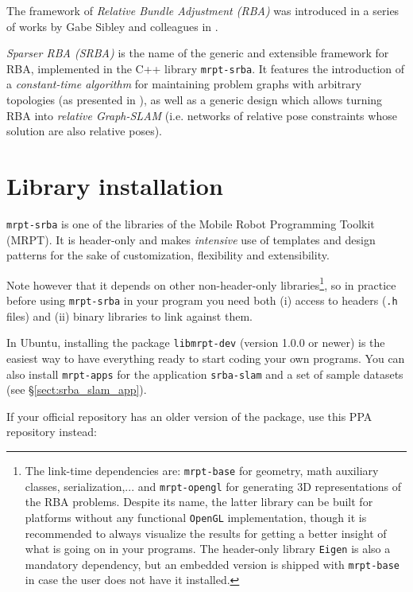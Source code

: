 \documentclass[a4paper,11pt]{article}
\begin{document}
The framework of \emph{Relative Bundle Adjustment (RBA)} was introduced in a series of works by Gabe Sibley and 
colleagues in \cite{sibley2009rba,sibley2009adaptive}. 

\emph{Sparser RBA (SRBA)} is the name of the generic and extensible framework for RBA, implemented in 
the C++ library \texttt{mrpt-srba}. It features the introduction of 
a \emph{constant-time algorithm} for maintaining problem graphs with arbitrary topologies 
(as presented in \cite{blanco2013srba}), as well as a generic design which allows turning RBA 
into \emph{relative Graph-SLAM} (i.e. networks of relative pose constraints whose solution are also relative poses).

\section{Library installation}

\texttt{mrpt-srba} is one of the libraries of the Mobile Robot Programming Toolkit (MRPT). 
It is header-only and makes \emph{intensive} use of templates and design patterns for the sake of customization, 
flexibility and extensibility. 

Note however that it depends on other non-header-only libraries\footnote{The link-time dependencies are: \texttt{mrpt-base} 
for geometry, math auxiliary classes, serialization,... and \texttt{mrpt-opengl} for generating 3D representations of 
the RBA problems. Despite its name, the latter library can be built for platforms without any 
functional \texttt{OpenGL} implementation, though it is recommended to always visualize the results for getting a better 
insight of what is going on in your programs. The header-only library \texttt{Eigen} \cite{eigenweb} is also a mandatory dependency, but 
an embedded version is shipped with \texttt{mrpt-base} in case the user does not have it installed.}, 
so in practice before using \texttt{mrpt-srba} in your program you need
both (i) access to headers (\texttt{.h} files) and (ii) binary libraries to link against them. 

In Ubuntu, installing the package \texttt{libmrpt-dev} (version 1.0.0 or newer) is the easiest way to have 
everything ready to start coding your own programs. You can also install \texttt{mrpt-apps} for the application \texttt{srba-slam} 
and a set of sample datasets (see \S\ref{sect:srba_slam_app}).

If your official repository has an older version of the package, use this PPA repository instead:
\end{document}
